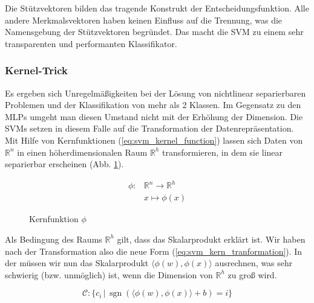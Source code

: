Die Stützvektoren bilden das tragende Konstrukt der Entscheidungsfunktion. 
Alle andere Merkmalsvektoren haben keinen Einfluss auf die Trennung, was die Namensgebung der Stützvektoren begründet. 
Das macht die \ac{SVM} zu einem sehr transparenten und performanten Klassifikator. 


\subsubsection{Kernel-Trick}
Es ergeben sich Unregelmäßigkeiten bei der Lösung von nichtlinear separierbaren Problemen und der Klassifikation von mehr als 2 Klassen.
Im Gegensatz zu den MLPs umgeht man diesen Umstand nicht mit der Erhöhung der Dimension. 
Die \ac{SVM}s setzen in diesem Falle auf die Transformation der Datenrepräsentation. 
Mit Hilfe von Kernfunktionen (\ref{eq:svm_kernel_function}) lassen sich Daten von $\mathbb{R}^n$ in einen höherdimensionalen Raum $\mathbb{R}^h$ transformieren, in dem sie linear separierbar erscheinen (Abb. \ref{fig:svm_kernel}). 

\begin{equation}
\label{eq:svm_kernel_function}
\begin{split}
    \phi : & \mathbb{R}^n \to \mathbb{R}^h \\
    & x \mapsto \phi(x)
\end{split} 
\end{equation}

\begin{figure}[htbp] \centering
    \caption{Kernfunktion $\phi$}
    \label{fig:svm_kernel}
\end{figure}

Als Bedingung des Raums $\mathbb{R}^h$ gilt, dass das Skalarprodukt erklärt ist. 
Wir haben nach der Transformation also die neue Form (\ref{eq:svm_kern_tranformation}). 
In der müssen wir nun das Skalarprodukt $\langle\phi(w),\phi(x)\rangle$ ausrechnen, was sehr schwierig (bzw. unmöglich) ist, wenn die Dimension von $\mathbb{R}^h$ zu groß wird.

\begin{equation}
\label{eq:svm_kern_tranformation}
    \mathcal{C}: \{ c_i \,|\, \operatorname{sgn}(\langle \phi(w),\phi(x) \rangle + b) = i \}
\end{equation}


